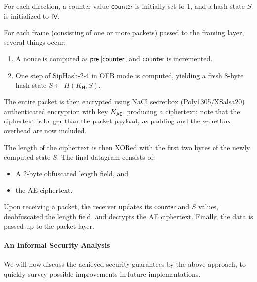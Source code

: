 For each direction, a counter value $\mathsf{counter}$ is initially set to 1, and a hash state $S$ is initialized to $\mathsf{IV}$.

For each frame (consisting of one or more packets) passed to the framing layer, several things occur:
\begin{enumerate}
    \item A nonce is computed as $ \mathsf{pre} \| \mathsf{counter}$, and $\mathsf{counter}$ is incremented.
    \item One step of SipHash-2-4 in OFB mode is computed, yielding a fresh 8-byte hash state $S \gets H(K_\mathsf{H}, S)$.
\end{enumerate}

The entire packet is then encrypted using NaCl secretbox (Poly1305/XSalsa20) authenticated encryption with key $K_\mathsf{AE}$, producing a ciphertext; note that the ciphertext is longer than the packet payload, as padding and the secretbox overhead are now included.

The length of the ciphertext is then XORed with the first two bytes of the newly computed state $S$. The final datagram consists of:
\begin{itemize}
    \item A 2-byte obfuscated length field, and
    \item the AE ciphertext.
\end{itemize}

Upon receiving a packet, the receiver updates its $\mathsf{counter}$ and $S$ values, deobfuscated the length field, and decrypts the AE ciphertext. Finally, the data is passed up to the packet layer.

\paragraph{An Informal Security Analysis}

We will now discuss the achieved security guarantees by the above approach, to quickly survey possible improvements in future implementations.


